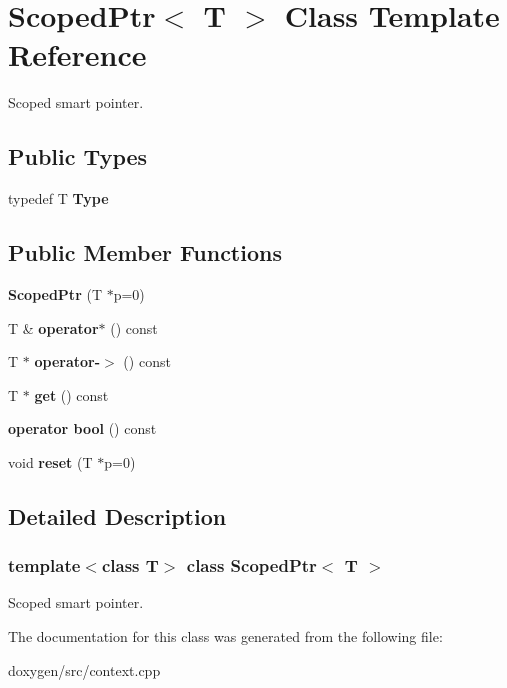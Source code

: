 \hypertarget{class_scoped_ptr}{}\section{Scoped\+Ptr$<$ T $>$ Class Template Reference}
\label{class_scoped_ptr}


Scoped smart pointer.  


\subsection*{Public Types}
\begin{DoxyCompactItemize}
\item 
\mbox{\label{class_scoped_ptr_adaf477f37ed2e00e76d916637be354cd}} 
typedef T {\bfseries Type}
\end{DoxyCompactItemize}
\subsection*{Public Member Functions}
\begin{DoxyCompactItemize}
\item 
\mbox{\label{class_scoped_ptr_a7a93e80d248708cbeb5d633ff2efd5cb}} 
{\bfseries Scoped\+Ptr} (T $\ast$p=0)
\item 
\mbox{\label{class_scoped_ptr_af758c5108750e6b68301aeb6940a7ae8}} 
T \& {\bfseries operator$\ast$} () const
\item 
\mbox{\label{class_scoped_ptr_a32dcc529ad9b4008c7aa19df3ae877be}} 
T $\ast$ {\bfseries operator-\/$>$} () const
\item 
\mbox{\label{class_scoped_ptr_a45ad0e24a1fad40f9d8d83a42e179bb5}} 
T $\ast$ {\bfseries get} () const
\item 
\mbox{\label{class_scoped_ptr_ae859dd2e361309503c5ee56afbf35fa9}} 
{\bfseries operator bool} () const
\item 
\mbox{\label{class_scoped_ptr_a9b5950519b300692fcb6c46d121caaf4}} 
void {\bfseries reset} (T $\ast$p=0)
\end{DoxyCompactItemize}


\subsection{Detailed Description}
\subsubsection*{template$<$class T$>$\newline
class Scoped\+Ptr$<$ T $>$}

Scoped smart pointer. 

The documentation for this class was generated from the following file\+:\begin{DoxyCompactItemize}
\item 
doxygen/src/context.\+cpp\end{DoxyCompactItemize}
